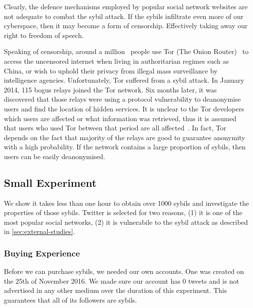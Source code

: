 Clearly, the defence mechanisms employed by popular social network websites are
not adequate to combat the sybil attack. If the sybils infiltrate even more of
our cyberspace, then it may become a form of censorship. Effectively taking away
our right to freedom of speech.

Speaking of censorship, around a million~\cite{tormetric} people use Tor (The
Onion Router)~\cite{dingledine2004tor} to access the uncensored internet when
living in authoritarian regimes such as China, or wish to uphold their privacy
from illegal mass surveillance by intelligence agencies. Unfortunately, Tor
suffered from a sybil attack. In January 2014, 115 bogus relays joined the Tor
network. Six months later, it was discovered that those relays were using a
protocol vulnerability to deanonymise users and find the location of hidden
services. It is unclear to the Tor developers which users are affected or what
information was retrieved, thus it is assumed that users who used Tor between
that period are all affected~\cite{torsybil}. In fact, Tor depends on the fact
that majority of the relays are good to guarantee anonymity with a high
probability. If the network contains a large proportion of sybils, then users
can be easily deanonymised.

\subsection{Small Experiment}
We show it takes less than one hour to obtain over 1000 sybils and investigate
the properties of those sybils. Twitter is selected for two reasons, (1) it is
one of the most popular social networks, (2) it is vulnerabile to the sybil
attack as described in \autoref{sec:external-studies}.


\subsubsection{Buying Experience}
Before we can purchase sybils, we needed our own accounts. One was created on
the 25th of November 2016. We made sure our account has 0 tweets and is not
advertised in any other medium over the duration of this experiment. This
guarantees that all of its followers are sybils.

